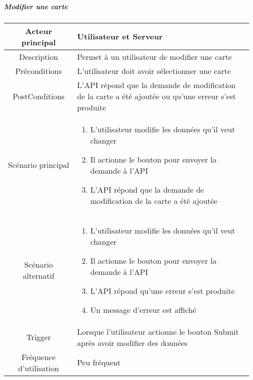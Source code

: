\documentclass{article}
\begin{document}
\subparagraph{Modifier une carte}
    \begin{table}[h]
        \begin{tabular}{|c|p{10cm}|}
        \hline
        Acteur principal& Utilisateur et Serveur    \\
        \hline
        Description&  Permet à un utilisateur de modifier une carte  \\
        \hline
        Préconditions&    L'utilisateur doit avoir sélectionner une carte  \\
        \hline
        PostConditions&  L'API répond que la demande de modification de la carte a été ajoutée ou qu'une erreur s'est produite    \\
        \hline
        Scénario principal& 
                \begin{enumerate}
                    \item L'utilisateur modifie les données qu'il veut changer
                    \item Il actionne le bouton pour envoyer la demande à l'API
                    \item L'API répond que la demande de modification de la carte a été ajoutée
                \end{enumerate}     \\
        \hline
        Scénario alternatif&  
        \begin{enumerate}
            \item L'utilisateur modifie les données qu'il veut changer
            \item Il actionne le bouton pour envoyer la demande à l'API
            \item L'API répond qu'une erreur s'est produite
            \item Un message d'erreur est affiché
        \end{enumerate}    \\
        \hline
        Trigger&   Lorsque l'utilisateur actionne le bouton Submit après avoir modifier des données   \\
        \hline
        Fréquence d'utilisation&    Peu fréquent  \\
        \hline
        \end{tabular}
    \end{table}

\newpage
\end{document}
